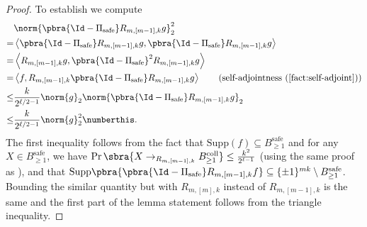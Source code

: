 \begin{proof}
    To establish  we compute 
    \begin{align*}
        &\norm{\pbra{\Id-\Pi_{\mathrm{safe}}}R_{m,[m-1],k}g}_2^2\\
        =&\left\langle \pbra{\Id-\Pi_{\mathrm{safe}}}R_{m,[m-1],k}g,\pbra{\Id-\Pi_{\mathrm{safe}}}R_{m,[m-1],k}g\right\rangle\\
        =&\left\langle R_{m,[m-1],k}g,\pbra{\Id-\Pi_{\mathrm{safe}}}^2R_{m,[m-1],k}g\right\rangle\\
        =&\left\langle f,R_{m,[m-1],k}\pbra{\Id-\Pi_{\mathrm{safe}}}R_{m,[m-1],k}g\right\rangle\tag{self-adjointness (\Cref{fact:self-adjoint})}\\
        \leq &\frac{k}{2^{\ell/2-1}}\norm{g}_2\norm{\pbra{\Id-\Pi_{\mathrm{safe}}}R_{m,[m-1],k}g}_2\\
        \leq&\frac{k}{2^{\ell/2-1}}\norm{g}_2^2\numberthis\label{eq:safe to not safe R}.
    \end{align*}
    The first inequality follows from  the fact that $\mathrm{Supp}(f)\subseteq B_{\geq1}^{\mathrm{safe}}$ and for any $X\in B_{\geq1}^{\mathrm{safe}}$, we have $\Pr\sbra{X\to_{R_{m,[m-1],k}}B_{\geq1}^{\mathrm{coll}}}\leq \frac{k^2}{2^{\ell-1}}$ (using the same proof as ), and that $\mathrm{Supp}\pbra{\pbra{\Id-\Pi_{\mathrm{safe}}}R_{m,[m-1],k}f}\subseteq \{\pm1\}^{mk}\setminus B_{\geq1}^{\mathrm{safe}}$. Bounding the similar quantity but with $R_{m,[m],k}$ instead of $R_{m,[m-1],k}$ is the same and the first part of the lemma statement follows from the triangle inequality. 
    

\end{proof}
